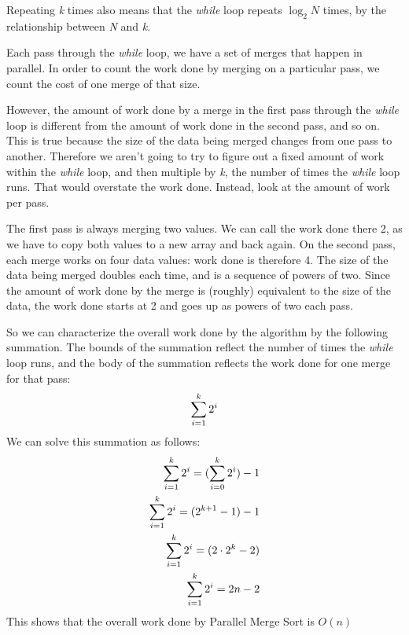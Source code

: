 \documentclass[letterpaper,10pt,openany,oneside]{sphinxmanual}
\begin{document}
Repeating \emph{k} times also means that the \emph{while} loop repeats $\log_2 N$ times, by the relationship between \emph{N} and \emph{k}.

Each pass through the \emph{while} loop, we have a set of merges that happen in parallel. In order to count the work done by merging on a particular pass, we count the cost of one merge of that size.

However, the amount of work done by a merge in the first pass through the \emph{while} loop is different from the amount of work done in the second pass, and so on. This is true because the size of the data being merged changes from one pass to another. Therefore we aren’t going to try to figure out a fixed amount of work within the \emph{while} loop, and then multiple by \emph{k}, the number of times the \emph{while} loop runs. That would overstate the work done. Instead, look at the amount of work per pass.

The first pass is always merging two values. We can call the work done there 2, as we have to copy both values to a new array and back again. On the second pass, each merge works on four data values: work done is therefore 4. The size of the data being merged doubles each time, and is a sequence of powers of two. Since the amount of work done by the merge is (roughly) equivalent to the size of the data, the work done starts at 2 and goes up as powers of two each pass.

So we can characterize the overall work done by the algorithm by the following summation. The bounds of the summation reflect the number of times the \emph{while} loop runs, and the body of the summation reflects the work done for one merge for that pass:
\begin{gather}
\begin{split}\sum_{i=1}^{k}2^i\end{split}\notag
\end{gather}
We can solve this summation as follows:
\begin{gather}
\begin{split}\sum_{i=1}^{k}2^i = (\sum_{i=0}^{k}2^i) - 1 \\
\sum_{i=1}^{k}2^i = (2^{k+1} - 1) - 1 \\
\sum_{i=1}^{k}2^i = (2 \cdot 2^k -2) \\
\sum_{i=1}^{k}2^i = 2n-2 \\\end{split}\notag
\end{gather}
This shows that the overall work done by Parallel Merge Sort is $O(n)$



\renewcommand{\indexname}{Index}
\printindex
\end{document}
